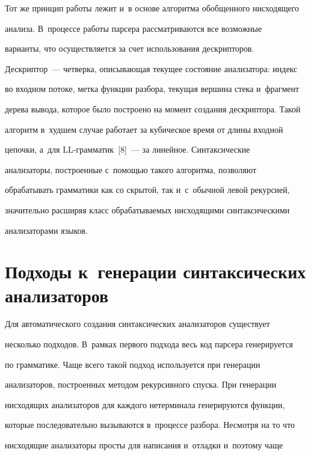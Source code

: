 Тот же принцип работы лежит и~в основе алгоритма обобщенного нисходящего


анализа. В~процессе работы парсера рассматриваются все возможные


варианты, что осуществляется за счет использования дескрипторов.


Дескриптор~--- четверка, описывающая текущее состояние анализатора: индекс


во входном потоке, метка функции разбора, текущая вершина стека и~фрагмент


дерева вывода, которое было построено на момент создания дескриптора. Такой


алгоритм в~худшем случае работает за кубическое время от длины входной


цепочки, а~для LL-грам\-ма\-тик~[8]~--- за линейное. Синтаксические


анализаторы, построенные с~помощью такого алгоритма, позволяют


обрабатывать грамматики как со скрытой, так и~с~обычной левой рекурсией,


значительно расширяя класс обрабатываемых нисходящими синтаксическими


анализаторами языков.





\vspace*{-3pt}





\section{Подходы к~генерации синтаксических анализаторов}





Для автоматического создания синтаксических анализаторов существует


несколько подходов. В~рамках первого подхода весь код парсера генерируется


по грамматике. Чаще всего такой подход используется при генерации


анализаторов, построенных методом рекурсивного спуска. При генерации


нисходящих анализаторов для каждого нетерминала генерируются функции,


которые последовательно вызываются в~процессе разбора. Несмотря на то что


нисходящие анализаторы просты для написания и~отладки и~поэтому чаще



